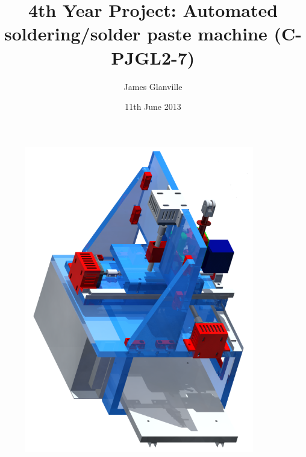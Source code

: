 
\usepackage{listings}                  %
\lstset{
	basicstyle=\ttfamily,
  basicstyle = \small
}

\providecommand{\e}[1]{\ensuremath{\times10^{#1}}}
\providecommand{\degrees}{\ensuremath{^{\circ}}}

\title{4th Year Project: Automated soldering/solder paste machine (C-PJGL2-7)} %
\author{James Glanville}
\date{11th June 2013}

\hypersetup{
    colorlinks,
    allcolors=blue,
    linktoc=all,
}



\maketitle

\begin{figure}[ht!]
\centering
\includegraphics[width=100mm]{resources/render.png}
\label{render}
\end{figure}

\newpage
\tableofcontents

\newpage

